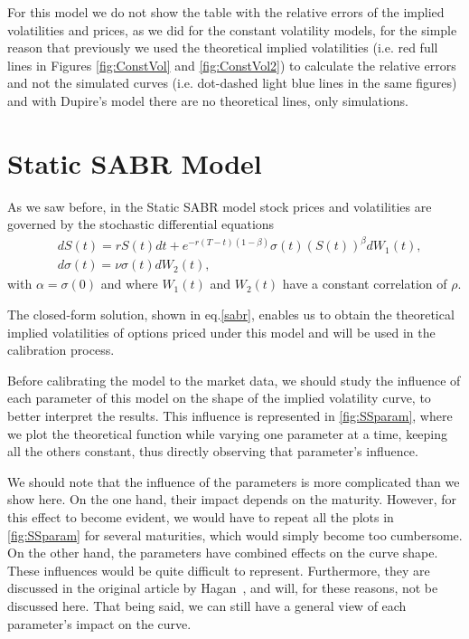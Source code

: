For this model we do not show the table with the relative errors of the implied volatilities and prices, as we did for the constant volatility models, for the simple reason that previously we used the theoretical implied volatilities (i.e. red full lines in Figures \ref{fig:ConstVol} and \ref{fig:ConstVol2}) to calculate the relative errors and not the simulated curves (i.e. dot-dashed light blue lines in the same figures) and with Dupire's model there are no theoretical lines, only simulations. 


\vfill
\newpage

\section{Static SABR Model}
As we saw before, in the Static SABR model stock prices and volatilities are governed by the stochastic differential equations
\begin{subequations}
\begin{align}
&dS(t)=rS(t)dt+e^{-r(T-t)(1-\beta)}\sigma(t)(S(t))^\beta dW_1(t),\\
&d\sigma(t)=\nu\sigma(t) dW_2(t),
\end{align}
\end{subequations}
\noindent with $\alpha=\sigma(0)$ and where $W_1(t)$ and $W_2(t)$ have a constant correlation of $\rho$.

The closed-form solution, shown in eq.\eqref{sabr}, enables us to obtain the theoretical implied volatilities of options priced under this model and will be used in the calibration process.

Before calibrating the model to the market data, we should study the influence of each parameter of this model on the shape of the implied volatility curve, to better interpret the results. This influence is represented in \autoref{fig:SSparam}, where we plot the theoretical function while varying one parameter at a time, keeping all the others constant, thus directly observing that parameter's influence.


We should note that the influence of the parameters is more complicated than we show here. On the one hand, their impact depends on the maturity. However, for this effect to become evident, we would have to repeat all the plots in \autoref{fig:SSparam} for several maturities, which would simply become too cumbersome.
On the other hand, the parameters have combined effects on the curve shape. These influences would be quite difficult to represent. Furthermore, they are discussed in the original article by Hagan~\citep{Hagan}, and will, for these reasons, not be discussed here.
That being said, we can still have a general view of each parameter's impact on the curve.

